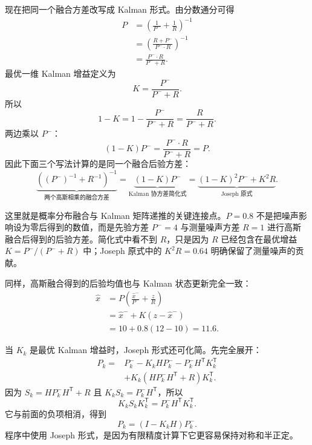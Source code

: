 \documentclass[UTF8,a4paper,11pt]{ctexart}
\newcommand{\prior}{^{-}}
\newcommand{\transpose}{^{\mathsf T}}
\begin{document}
现在把同一个融合方差改写成 Kalman 形式。由分数通分可得
\begin{align}
P
&=\left(\frac{1}{P\prior}+\frac{1}{R}\right)^{-1}\\
&=\left(\frac{R+P\prior}{P\prior\!\cdot R}\right)^{-1}\\
&=\frac{P\prior\!\cdot R}{P\prior+R}.
\end{align}
最优一维 Kalman 增益定义为
\begin{equation}
K=\frac{P\prior}{P\prior+R}.
\end{equation}
所以
\begin{equation}
1-K
=1-\frac{P\prior}{P\prior+R}
=\frac{R}{P\prior+R}.
\end{equation}
两边乘以 $P\prior$：
\begin{equation}
(1-K)P\prior
=\frac{P\prior\!\cdot R}{P\prior+R}
=P.
\end{equation}
因此下面三个写法计算的是同一个融合后验方差：
\begin{equation}
\boxed{
\underbrace{
\left((P\prior)^{-1}+R^{-1}\right)^{-1}
}_{\text{两个高斯相乘的融合方差}}
=
\underbrace{
(1-K)P\prior
}_{\text{Kalman 协方差简化式}}
=
\underbrace{
(1-K)^2P\prior+K^2R
}_{\text{Joseph 原式}}
}.
\end{equation}

\begin{keybox}
这里就是概率分布融合与 Kalman 矩阵递推的关键连接点。$P=0.8$ 不是把噪声影响设为零后得到的数值，而是先验方差 $P\prior=4$ 与测量噪声方差 $R=1$ 进行高斯融合后得到的后验方差。简化式中看不到 $R$，只是因为 $R$ 已经包含在最优增益 $K=P\prior/(P\prior+R)$ 中；Joseph 原式中的 $K^2R=0.64$ 明确保留了测量噪声的贡献。
\end{keybox}

同样，高斯融合得到的后验均值也与 Kalman 状态更新完全一致：
\begin{align}
\hat x
&=P\left(
\frac{\hat x\prior}{P\prior}
+\frac{z}{R}
\right)\\
&=\hat x\prior+K(z-\hat x\prior)\\
&=10+0.8(12-10)
=11.6.
\end{align}

当 $K_k$ 是最优 Kalman 增益时，Joseph 形式还可化简。先完全展开：
\begin{align}
P_k
={}&P_k\prior-K_kHP_k\prior-P_k\prior H\transpose K_k\transpose\\
&+K_k(HP_k\prior H\transpose+R)K_k\transpose.
\end{align}
因为 $S_k=HP_k\prior H\transpose+R$ 且 $K_kS_k=P_k\prior H\transpose$，所以
\begin{equation}
K_kS_kK_k\transpose=P_k\prior H\transpose K_k\transpose.
\end{equation}
它与前面的负项相消，得到
\begin{equation}
P_k=(I-K_kH)P_k\prior.
\end{equation}
程序中使用 Joseph 形式，是因为有限精度计算下它更容易保持对称和半正定。
\end{document}
